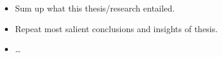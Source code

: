 \begin{itemize}
    \item Sum up what this thesis/research entailed.
    \item Repeat most salient conclusions and insights of thesis.
    \item \dots
\end{itemize}